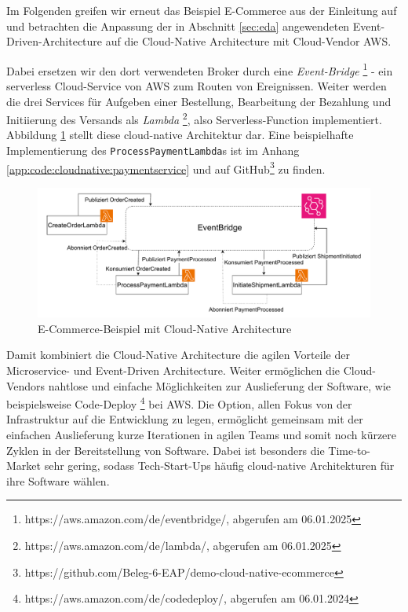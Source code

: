 \documentclass[acmtog]{acmart}
\begin{document}
Im Folgenden greifen wir erneut das Beispiel E-Commerce aus der Einleitung auf und betrachten die Anpassung der in
Abschnitt \ref{sec:eda} angewendeten Event-Driven-Architecture auf die Cloud-Native Architecture mit Cloud-Vendor AWS\@.

Dabei ersetzen wir den dort verwendeten Broker durch eine \textit{Event-Bridge} \footnote{https://aws.amazon.com/de/eventbridge/, abgerufen am 06.01.2025}
- ein serverless Cloud-Service von AWS zum Routen von Ereignissen.
Weiter werden die drei Services für Aufgeben einer Bestellung, Bearbeitung der Bezahlung und Initiierung des Versands als \textit{Lambda} \footnote{https://aws.amazon.com/de/lambda/, abgerufen am 06.01.2025},
also Serverless-Function implementiert.
Abbildung \ref{fig:cloudnativeecommerce} stellt diese cloud-native Architektur dar.
Eine beispielhafte Implementierung des \texttt{ProcessPaymentLambda}s ist im Anhang \ref{app:code:cloudnative:paymentservice} und auf GitHub\footnote{https://github.com/Beleg-6-EAP/demo-cloud-native-ecommerce} zu finden.
\begin{figure}[!h]
  \centering
  \includegraphics[width=\linewidth]{images/cloud-native/cloud-native-ecommerce.drawio}
  \caption{E-Commerce-Beispiel mit Cloud-Native Architecture}
  \label{fig:cloudnativeecommerce}
\end{figure}

Damit kombiniert die Cloud-Native Architecture die agilen Vorteile der Microservice- und Event-Driven Architecture.
Weiter ermöglichen die Cloud-Vendors nahtlose und einfache Möglichkeiten zur Auslieferung der Software,
wie beispielsweise Code-Deploy \footnote{https://aws.amazon.com/de/codedeploy/, abgerufen am 06.01.2024} bei AWS\@.
Die Option, allen Fokus von der Infrastruktur auf die Entwicklung zu legen, ermöglicht gemeinsam mit der einfachen Auslieferung kurze Iterationen in agilen Teams
und somit noch kürzere Zyklen in der Bereitstellung von Software.
Dabei ist besonders die Time-to-Market sehr gering, sodass Tech-Start-Ups häufig cloud-native Architekturen für ihre Software wählen. %
\end{document}
